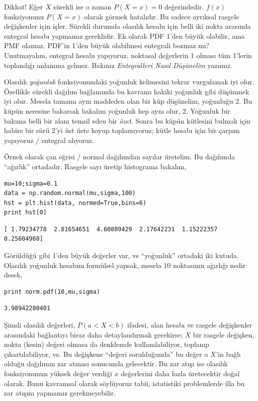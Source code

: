 \documentclass[12pt,fleqn]{article}\usepackage{../../common}
\begin{document}
Dikkat! Eğer $X$ sürekli ise o zaman $P(X = x) = 0$ değerindedir. $f(x)$
fonksiyonunu $P(X=x)$ olarak görmek hatalıdır. Bu sadece ayrıksal rasgele
değişkenler için işler. Sürekli durumda olasılık hesabı için belli iki
nokta arasında entegral hesabı yapmamız gereklidir. Ek olarak PDF 1'den
büyük olabilir, ama PMF olamaz. PDF'in 1'den büyük olabilmesi entegrali
bozmaz mı? Unutmayalım, entegral hesabı yapıyoruz, noktasal değerlerin 1
olması tüm 1'lerin toplandığı anlamına gelmez. Bakınız {\em Entegralleri
  Nasıl Düşünelim} yazımız.

Olasılık {\em yoğunluk} fonksiyonundaki yoğunluk kelimesini tekrar
vurgulamak iyi olur. Özellikle sürekli dağılım bağlamında bu kavramı hakiki
yoğunluk gibi düşünmek iyi olur. Mesela tamamı aynı maddeden olan bir küp
düşünelim, yoğunluğu 2. Bu küpün neresine bakarsak bakalım yoğunluk hep
aynı olur, 2. Yoğunluk bir bakıma belli bir alanı temsil eden bir {\em
  özet}. Sonra bu küpün kütlesini bulmak için habire bir sürü 2'yi üst üste
koyup toplamıyoruz; kütle hesabı için bir çarpım yapıyoruz / entegral
alıyoruz.

Örnek olarak çan eğrisi / normal dağılımdan sayılar üretelim. Bu dağılımda
``ağırlık'' ortadadır. Rasgele sayı üretip histograma bakalım,

\begin{verbatim}
mu=10;sigma=0.1
data = np.random.normal(mu,sigma,100)
hst = plt.hist(data, normed=True,bins=6)
print hst[0]
\end{verbatim}

\begin{verbatim}
[ 1.79234778  2.81654651  4.60889429  2.17642231  1.15222357  0.25604968]
\end{verbatim}

Görüldüğü gibi 1'den büyük değerler var, ve ``yoğunluk'' ortadaki iki
kutuda. Olasılık yoğunluk hesabını formülsel yapsak, mesela 10 noktasının
ağırlığı nedir desek, 

\begin{verbatim}
print norm.pdf(10,mu,sigma)
\end{verbatim}

\begin{verbatim}
3.98942280401
\end{verbatim}

Şimdi olasılık değerleri, $P(a < X < b)$ ifadesi, alan hesabı ve rasgele
değişkenler arasındaki bağlantıyı biraz daha detaylandırmak gerekirse; $X$
bir rasgele değişken, nokta (kesin) değeri olmasa da denklemde
kullanılabiliyor, toplanıp çıkartılabiliyor, vs. Bu değişkene ``değeri
sorulduğunda'' bu değer o $X$'in bağlı olduğu dağılımın zar atması
sonucunda gelecektir. Bu zar atışı ise olasılık fonksiyonunun yüksek değer
verdiği $x$ değerlerini daha fazla üretecektir doğal olarak. Bunu kavramsal
olarak söylüyoruz tabii, istatistiki problemlerde illa bu zar atışını
yapmamız gerekmeyebilir.
\end{document}
